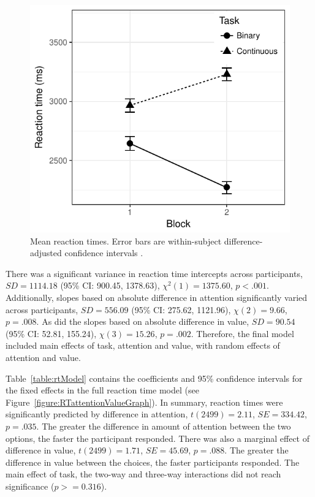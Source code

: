 \documentclass[12pt]{article}
\begin{document}
\begin{figure}
	\centering
	\includegraphics{images/RTorderEffects.pdf}
	\caption{Mean reaction times. Error bars are within-subject difference-adjusted confidence intervals \protect\cite{Baguley2012}.}
	\label{figure:RTblockGraph}
\end{figure}

There was a significant variance in reaction time intercepts across participants, $SD=1114.18$ (95\% CI: 900.45, 1378.63), $\chi^2(1)=1375.60$, $p<.001$. Additionally, slopes based on absolute difference in attention significantly varied across participants, $SD=556.09$ (95\% CI: 275.62, 1121.96), $\chi(2)=9.66$, $p=.008$. As did the slopes based on absolute difference in value, $SD=90.54$ (95\% CI: 52.81, 155.24), $\chi(3)=15.26$, $p=.002$. Therefore, the final model included main effects of task, attention and value, with random effects of attention and value. 
	


Table~\ref{table:rtModel} contains the coefficients and 95\% confidence intervals for the fixed effects in the full reaction time model (see Figure~\ref{figure:RTattentionValueGraph}). In summary, reaction times were significantly predicted by difference in attention, $t(2499)=2.11$, $SE=334.42$, $p=.035$. The greater the difference in amount of attention between the two options, the faster the participant responded. There was also a marginal effect of difference in value, $t(2499)=1.71$, $SE=45.69$, $p=.088$. The greater the difference in value between the choices, the faster participants responded. The main effect of task, the two-way and three-way interactions did not reach significance ($p>=0.316$). 
\end{document}
